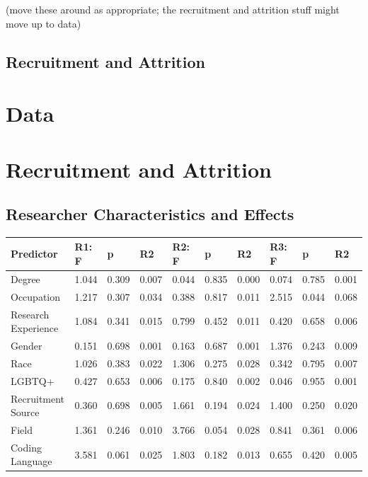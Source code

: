 \documentclass[
  letterpaper,
  DIV=11,
  numbers=noendperiod]{scrartcl}
\begin{document}
(move these around as appropriate; the recruitment and attrition stuff
might move up to data)

\hypertarget{recruitment-and-attrition-1}{%
\subsection{Recruitment and
Attrition}\label{recruitment-and-attrition-1}}

\hypertarget{data-1}{%
\section{Data}\label{data-1}}

\hypertarget{recruitment-and-attrition-2}{%
\section{Recruitment and Attrition}\label{recruitment-and-attrition-2}}

\hypertarget{researcher-characteristics-and-effects}{%
\subsection{Researcher Characteristics and
Effects}\label{researcher-characteristics-and-effects}}

\begin{tabular}{llllllllll}
\toprule
Predictor & R1: F & p & R2 & R2: F & p & R2 & R3: F & p & R2\\
\midrule
Degree & 1.044 & 0.309 & 0.007 & 0.044 & 0.835 & 0.000 & 0.074 & 0.785 & 0.001\\
Occupation & 1.217 & 0.307 & 0.034 & 0.388 & 0.817 & 0.011 & 2.515 & 0.044 & 0.068\\
Research Experience & 1.084 & 0.341 & 0.015 & 0.799 & 0.452 & 0.011 & 0.420 & 0.658 & 0.006\\
Gender & 0.151 & 0.698 & 0.001 & 0.163 & 0.687 & 0.001 & 1.376 & 0.243 & 0.009\\
Race & 1.026 & 0.383 & 0.022 & 1.306 & 0.275 & 0.028 & 0.342 & 0.795 & 0.007\\
\addlinespace
LGBTQ+ & 0.427 & 0.653 & 0.006 & 0.175 & 0.840 & 0.002 & 0.046 & 0.955 & 0.001\\
Recruitment Source & 0.360 & 0.698 & 0.005 & 1.661 & 0.194 & 0.024 & 1.400 & 0.250 & 0.020\\
Field & 1.361 & 0.246 & 0.010 & 3.766 & 0.054 & 0.028 & 0.841 & 0.361 & 0.006\\
Coding Language & 3.581 & 0.061 & 0.025 & 1.803 & 0.182 & 0.013 & 0.655 & 0.420 & 0.005\\
\bottomrule
\end{tabular}
\end{document}
